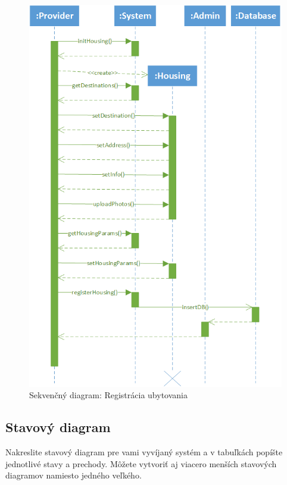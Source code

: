 \begin{figure}[!htbp]
    \centering
    \includegraphics[width=.95\linewidth]{img/seq_registerHousing.png}
    \caption{Sekvenčný diagram: Registrácia ubytovania}
    \label{seq_diagram_registerHou}
\end{figure}

\newpage

\subsection{Stavový diagram}
Nakreslite stavový diagram pre vami vyvíjaný systém a v tabuľkách popíšte
jednotlivé stavy a prechody. Môžete vytvoriť aj viacero menších stavových diagramov namiesto
jedného veľkého.


